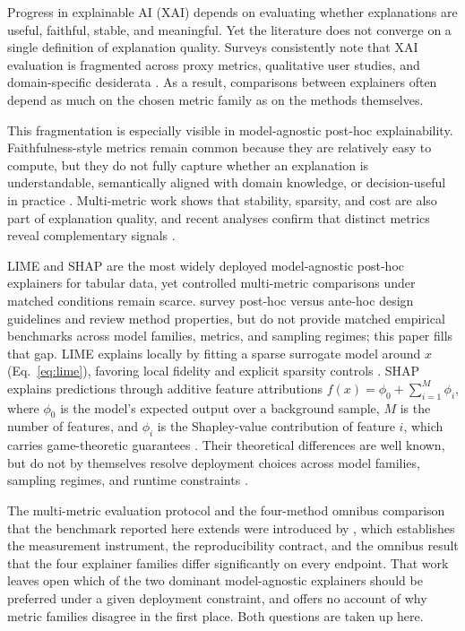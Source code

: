 \documentclass[10pt,a4paper,twoside]{article}
\begin{document}
Progress in explainable AI (XAI) depends on evaluating whether
explanations are useful, faithful, stable, and meaningful. Yet the
literature does not converge on a single definition of explanation
quality. Surveys consistently note that XAI evaluation is fragmented
across proxy metrics, qualitative user studies, and domain-specific
desiderata \citep{adadi2018xai,arrieta2020xai,kadir2023metrics,
canha2025benchmark}. As a result, comparisons between explainers often
depend as much on the chosen metric family as on the methods themselves.

\begin{sloppypar}
This fragmentation is especially visible in model-agnostic post-hoc
explainability. Faithfulness-style metrics remain common because they are
relatively easy to compute, but they do not fully capture whether an
explanation is understandable, semantically aligned with domain knowledge,
or decision-useful in practice
\citep{ali2023trustworthy,longo2024manifesto}.
Multi-metric work shows that stability, sparsity, and cost are also
part of explanation quality, and recent analyses confirm that distinct
metrics reveal complementary signals \citep{pawlicki2024metrics,zheng2025ffidelity}.
\end{sloppypar}

LIME and SHAP are the most widely deployed model-agnostic post-hoc
explainers for tabular data, yet controlled multi-metric comparisons
under matched conditions remain scarce. \citet{retzlaff2024posthoc} survey post-hoc versus ante-hoc design
guidelines and review method properties, but do not provide matched
empirical benchmarks across model families, metrics, and sampling regimes;
this paper fills that gap. LIME explains locally by
fitting a sparse surrogate model around $x$ (Eq.~\ref{eq:lime}),
favoring local fidelity and explicit sparsity controls
\citep{ribeiro2016why}. SHAP explains predictions through additive
feature attributions $f(x) = \phi_0 + \sum_{i=1}^{M} \phi_i$, where
$\phi_0$ is the model's expected output over a background sample, $M$
is the number of features, and $\phi_i$ is the Shapley-value contribution
of feature $i$, which carries game-theoretic guarantees
\citep{lundberg2017unified}. Their theoretical differences are well
known, but do not by themselves resolve deployment choices across model
families, sampling regimes, and runtime constraints
\citep{retzlaff2024posthoc,ali2023trustworthy}.

The multi-metric evaluation protocol and the four-method omnibus comparison
that the benchmark reported here extends were introduced by
\citet{herrera2026framework}, which establishes the measurement instrument,
the reproducibility contract, and the omnibus result that the four
explainer families differ significantly on every endpoint. That work leaves
open which of the two dominant model-agnostic explainers should be preferred
under a given deployment constraint, and offers no account of why metric
families disagree in the first place. Both questions are taken up here.
\end{document}
